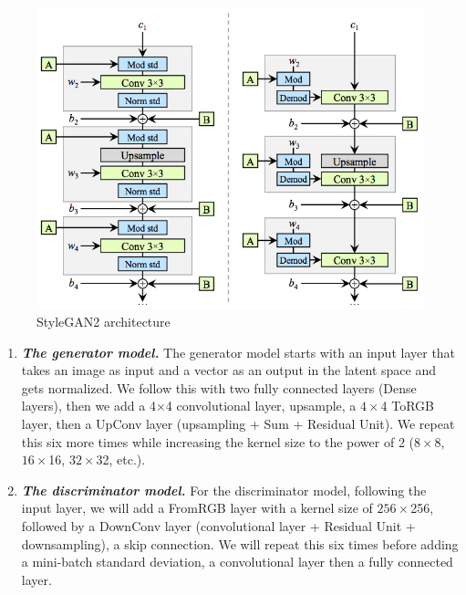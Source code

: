 \documentclass{report}
\begin{document}
\begin{itemize}
    \begin{figure}[!ht]
    \centering 
    \includegraphics[width=1\textwidth]{figs/stylegan2_arch.png}
    \caption{StyleGAN2 architecture}
    \end{figure}


    \begin{enumerate}
        \item \textbf{\textit{The generator model.}} The generator model starts with an input layer that takes an image as input and a vector as an output in the latent space and gets normalized. We follow this with two fully connected layers (Dense layers), then we add a 4×4 convolutional layer, upsample, a $4 \times $4 ToRGB layer, then a UpConv layer (upsampling + Sum + Residual Unit). We repeat this six more times while increasing the kernel size to the power of 2 ($8 \times $8, $16 \times $16, $32 \times $32, etc.). 
        
        \item \textbf{\textit{The discriminator model.}} For the discriminator model, following the input layer, we will add a FromRGB layer with a kernel size of $256 \times $256, followed by a DownConv layer (convolutional layer + Residual Unit + downsampling), a skip connection. We will repeat this six times before adding a mini-batch standard deviation, a convolutional layer then a fully connected layer.
        

\end{enumerate}
\end{itemize}
\end{document}
